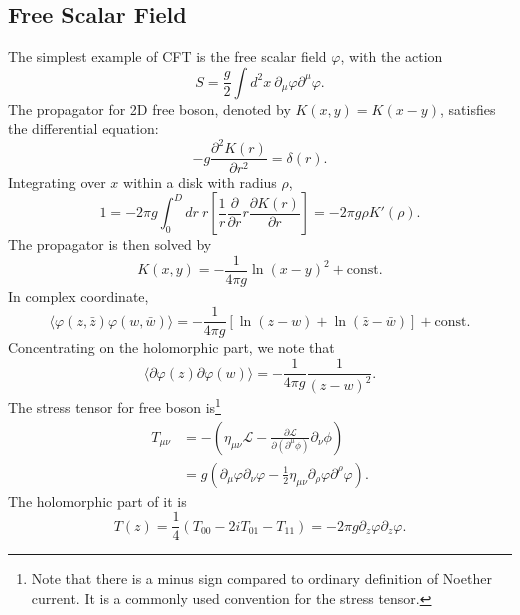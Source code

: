 \documentclass[aps,prb,superscriptaddress,nofootinbib]{revtex4}
\begin{document}
\subsection{Free Scalar Field}
The simplest example of CFT is the free scalar field $\varphi$, with the action
\begin{equation}
	S = \frac{g}{2}\int d^2x\ \partial_\mu\varphi \partial^\mu \varphi.
\end{equation}
The propagator for 2D free boson, denoted by $K(x,y) = K(x-y)$, satisfies the differential equation:
\begin{equation}
	-g \frac{\partial^2 K(r)}{\partial r^2}  = \delta(r).
\end{equation}
Integrating over $x$ within a disk with radius $\rho$,
\begin{equation}
	1 = -2\pi g \int _0^D d r \ r \left[\frac{1}{r} \frac{\partial}{\partial r}  r \frac{\partial K(r)}{\partial r}\right]
	= -2\pi g \rho K'(\rho).
\end{equation}
The propagator is then solved by
\begin{equation}
	K(x,y) = -\frac{1}{4\pi g} \ln(x-y)^2 + \text{const}.
\end{equation}
In complex coordinate,
\begin{equation}
	\langle\varphi(z,\bar z)\varphi(w,\bar w)\rangle = -\frac{1}{4\pi g}\left[\ln(z-w) + \ln(\bar z- \bar w)\right] + \text{const}. 
\end{equation}
Concentrating on the holomorphic part, we note that
\begin{equation}
	\langle\partial\varphi(z)\partial\varphi(w)\rangle = -\frac{1}{4\pi g}\frac{1}{(z-w)^2}.
\end{equation}
The stress tensor for free boson is\footnote{Note that there is a minus sign compared to ordinary definition of Noether current. It is a commonly used convention for the stress tensor.}
\begin{equation}
\begin{aligned}
	T_{\mu\nu} 
	&= -\left(\eta_{\mu\nu} \mathcal L - \frac{\partial\mathcal L}{\partial(\partial^\mu\phi)}\partial_\nu \phi \right) \\
	&= g\left(\partial_\mu\varphi\partial_\nu\varphi - \frac{1}{2} \eta_{\mu\nu}\partial_\rho\varphi\partial^\rho\varphi \right).
\end{aligned}
\end{equation}
The holomorphic part of it is
\begin{equation}
	T(z) = \frac{1}{4}(T_{00} - 2iT_{01} - T_{11}) = -2\pi g \partial_z\varphi \partial_z\varphi.
\end{equation}
\end{document}
